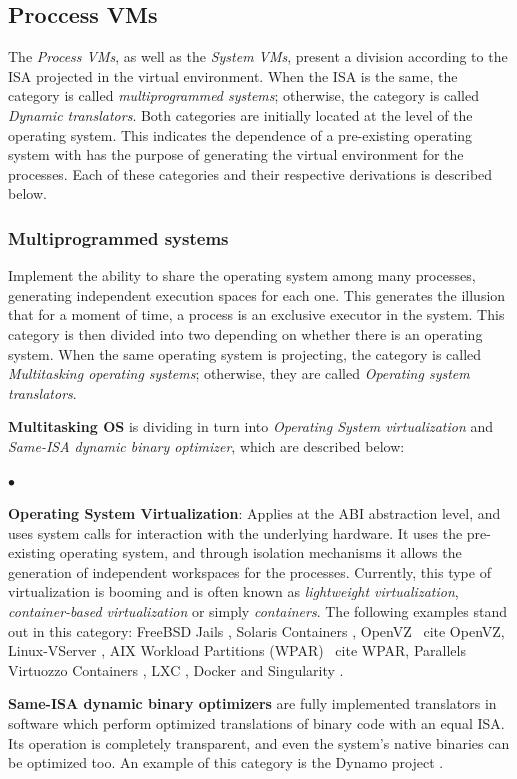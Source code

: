 	\subsection{Proccess VMs}
	
	The \textit{Process VMs}, as well as the \textit{System VMs}, present a division according to the ISA projected in the virtual environment. When the ISA is the same, the category is called \textit{multiprogrammed systems}; otherwise, the category is called \textit{Dynamic translators}. Both categories are initially located at the level of the operating system. This indicates the dependence of a pre-existing operating system with has the purpose of generating the virtual environment for the processes. Each of these categories and their respective derivations is described below.
	
	\subsubsection{Multiprogrammed systems}
	
	Implement the ability to share the operating system among many processes, generating independent execution spaces for each one. This generates the illusion that for a moment of time, a process is an exclusive executor in the system. This category is then divided into two depending on whether there is an operating system. When the same operating system is projecting, the category is called \textit{Multitasking operating systems}; otherwise, they are called \textit{Operating system translators}.
	
	\textbf {Multitasking OS} is dividing in turn into \textit{Operating System virtualization} and \textit{Same-ISA dynamic binary optimizer}, which are described below:
		
	\begin{list}{$\bullet$}{\setlength{\leftmargin}{5pt}}
	
		\item \textbf{Operating System Virtualization}: Applies at the ABI abstraction level, and uses system calls for interaction with the underlying hardware. It uses the pre-existing operating system, and through isolation mechanisms it allows the generation of independent workspaces for the processes. Currently, this type of virtualization is booming and is often known as \textit {lightweight virtualization}, \textit{container-based virtualization} or simply \textit{containers}. The following examples stand out in this category: FreeBSD Jails \cite {Biederman2006}, Solaris Containers \cite {SolarisZones}, OpenVZ \ cite {OpenVZ}, Linux-VServer \cite {Linux-VServer}, AIX Workload Partitions (WPAR) \ cite {WPAR}, Parallels Virtuozzo Containers \cite {Virtuozzo}, LXC \cite {LXC}, Docker \cite {Docker} and Singularity \cite {Sylabs.io}.
			
		\item \textbf{Same-ISA dynamic binary optimizers} are fully implemented translators in software which perform optimized translations of binary code with an equal ISA. Its operation is completely transparent, and even the system's native binaries can be optimized too. An example of this category is the Dynamo project \cite{Bala2011}.
	\end{list}
		
